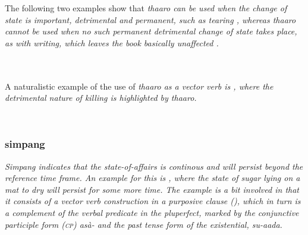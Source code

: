 The following two examples show that \em thaaro \em can be used when the change of state is important, detrimental and permanent, such as tearing , whereas \em thaaro \em cannot be used when no such permanent detrimental change of state takes place, as with writing, which leaves the book basically unaffected .


 \\

 \\
 
A naturalistic example of the use of \em thaaro \em as a vector verb is , where the detrimental nature of killing is highlighted by \em thaaro.\em

 \\


% 



\subsubsection{simpang}\label{sec:wc:simpang}
\em Simpang \em indicates that the state-of-affairs is continous and will persist beyond the reference time frame. An example for this is , where the state of sugar lying on a mat to dry will persist for some more time. The example is a bit involved in that it consists of a vector verb construction in a purposive clause (), which in turn is a complement of the verbal predicate   in the pluperfect, marked by the conjunctive participle form (\textsc{cp}) \em asà- \em and the past tense form of the existential, \em su-aada\em.



